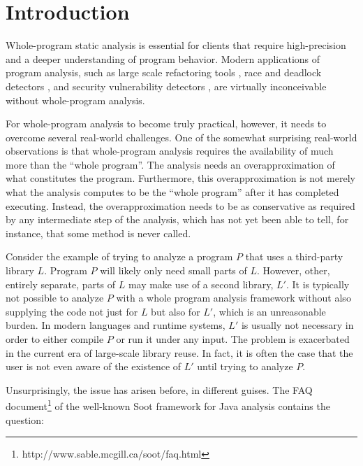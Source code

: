 
\section{Introduction}
\label{intro}

Whole-program static analysis is essential for clients that require
high-precision
and a deeper understanding of program behavior. Modern applications of
program analysis, such as large scale refactoring tools
\cite{journals/software/Dig11}, race and deadlock detectors
\cite{pldi/NaikAW06}, and security vulnerability detectors
\cite{sigsoft/MadsenLF13,uss/GuarnieriL09}, are virtually
inconceivable without whole-program analysis.

For whole-program analysis to become truly practical, however, it
needs to overcome several real-world challenges. One of the somewhat
surprising real-world observations is that whole-program analysis
requires the availability of much more than the ``whole program''.
The analysis needs an overapproximation of what constitutes the
program. Furthermore, this overapproximation is not merely
what the analysis computes to be the ``whole program'' after it
has completed executing. Instead, the overapproximation needs to be
as conservative as required by any intermediate step of the analysis,
which has not yet been able to tell, for instance, that some method
is never called.

Consider the example of trying to analyze a program $P$ that uses a
third-party library $L$. Program $P$ will likely only need small parts
of $L$.  However, other, entirely separate, parts of $L$ may make use
of a second library, $L'$.  It is typically not possible to analyze
$P$ with a whole program analysis framework without also supplying the
code not just for $L$ but also for $L'$, which is an unreasonable
burden. In modern languages and runtime systems, $L'$ is usually not
necessary in order to either compile $P$ or run it under any
input. The problem is exacerbated in the current era of large-scale
library reuse.  In fact, it is often the case that the user is not
even aware of the existence of $L'$ until trying to analyze $P$.

Unsurprisingly, the issue has arisen before, in different guises.  The
FAQ document\footnote{http://www.sable.mcgill.ca/soot/faq.html} of the
well-known Soot framework for Java
analysis \cite{vall99soot,valleerai00optimizing} contains the
question:


